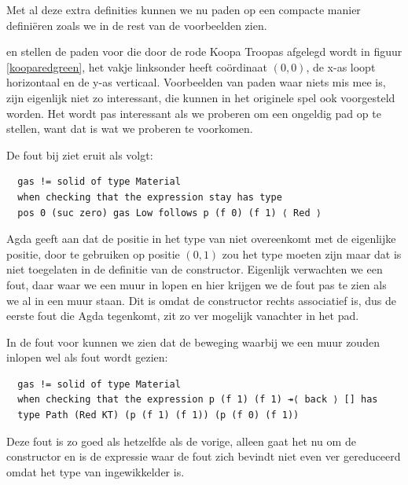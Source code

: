 Met al deze extra definities kunnen we nu paden op een compacte manier
definiëren zoals we in de rest van de voorbeelden zien.


 en  stellen de paden voor die door de
rode Koopa Troopas afgelegd wordt in figuur \ref{kooparedgreen}, het vakje
linksonder heeft coördinaat $(0,0)$, de x-as loopt horizontaal en de y-as
verticaal. Voorbeelden van paden waar niets mis mee is, zijn eigenlijk niet zo
interessant, die kunnen in het originele spel ook voorgesteld worden. Het wordt
pas interessant als we proberen om een ongeldig pad op te stellen, want dat is
wat we proberen te voorkomen.


De fout bij  ziet eruit als volgt:

\begin{verbatim}
  gas != solid of type Material
  when checking that the expression stay has type
  pos 0 (suc zero) gas Low follows p (f 0) (f 1) ⟨ Red ⟩
\end{verbatim}

Agda geeft aan dat de positie in het type van  niet overeenkomt met
de eigenlijke positie, door  te gebruiken op positie $(0,1)$ zou
het type  moeten zijn maar dat is niet toegelaten in de definitie van
de constructor. Eigenlijk verwachten we een fout, daar waar we een muur in
lopen en hier krijgen we de fout pas te zien als we al in een muur staan. Dit
is omdat de  constructor rechts associatief is, dus de eerste
fout die Agda tegenkomt, zit zo ver mogelijk vanachter in het pad.

In de fout voor  kunnen we zien dat de beweging waarbij
we een muur zouden inlopen wel als fout wordt gezien:

\begin{verbatim}
  gas != solid of type Material
  when checking that the expression p (f 1) (f 1) ↠⟨ back ⟩ [] has
  type Path (Red KT) (p (f 1) (f 1)) (p (f 0) (f 1))
\end{verbatim}

Deze fout is zo goed als hetzelfde als de vorige, alleen gaat het nu om de
 constructor en is de expressie waar de fout zich bevindt niet even
ver gereduceerd omdat het type van  ingewikkelder is.

